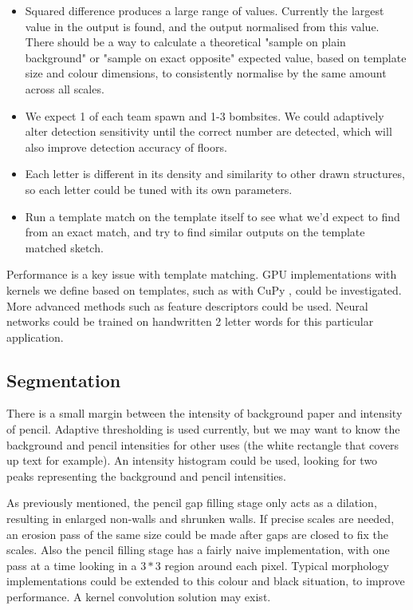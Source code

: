 \documentclass{IEEEtran}
\begin{document}
\begin{itemize}
\item Squared difference produces a large range of values. Currently the largest value in the output is found, and the output normalised from this value. There should be a way to calculate a theoretical "sample on plain background" or "sample on exact opposite" expected value, based on template size and colour dimensions, to consistently normalise by the same amount across all scales. 
\item We expect 1 of each team spawn and 1-3 bombsites. We could adaptively alter detection sensitivity until the correct number are detected, which will also improve detection accuracy of floors. 
\item Each letter is different in its density and similarity to other drawn structures, so each letter could be tuned with its own parameters.
\item Run a template match on the template itself to see what we'd expect to find from an exact match, and try to find similar outputs on the template matched sketch.
\end{itemize}

Performance is a key issue with template matching. GPU implementations with kernels we define based on templates, such as with CuPy \cite{cupy2015user}, could be investigated. More advanced methods such as feature descriptors could be used. Neural networks could be trained on handwritten 2 letter words for this particular application.

\subsection{Segmentation}

There is a small margin between the intensity of background paper and intensity of pencil. Adaptive thresholding is used currently, but we may want to know the background and pencil intensities for other uses (the white rectangle that covers up text for example). An intensity histogram could be used, looking for two peaks representing the background and pencil intensities.

As previously mentioned, the pencil gap filling stage only acts as a dilation, resulting in enlarged non-walls and shrunken walls. If precise scales are needed, an erosion pass of the same size could be made after gaps are closed to fix the scales. Also the pencil filling stage has a fairly naive implementation, with one pass at a time looking in a $3*3$ region around each pixel. Typical morphology implementations could be extended to this colour and black situation, to improve performance. A kernel convolution solution may exist.
\end{document}
